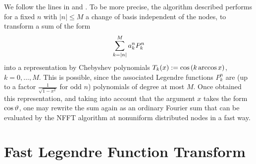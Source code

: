 We follow the lines in \cite{postta97} and \cite{kupo02}. To be more precise, the algorithm described performs for a fixed $n$ with $|n| \le M$ a change of basis independent of the nodes, to transform a sum of the form
\begin{equation}
  \label{NFSFT:LegendreSum}
  \sum_{k=\left\vert n\right\vert}^M a_{k}^n P_{k}^n
\end{equation}
into a representation by Chebyshev polynomials $T_{k}{\hspace{-0.4ex}}\left(x\right) := \cos{\hspace{-0.4ex}}\left(k \arccos x\right)$, $k=0,\ldots,M$. This is possible, since the associated Legendre functions $P_{k}^n$ are (up to a factor $\frac{1}{\sqrt{1-x^2}}$ for odd $n$) polynomials of degree at most $M$. Once obtained this representation, and taking into account that the argument $x$ takes the form $\cos \vartheta$, one may rewrite the sum again as an ordinary Fourier sum that can be evaluated by the NFFT algorithm at nonuniform distributed nodes in a fast way. 



\section{Fast Legendre Function Transform}
\label{DSFT:FLFT}

